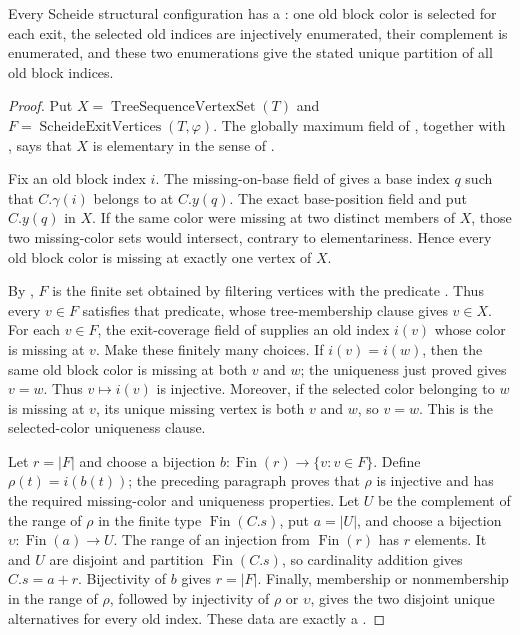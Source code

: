 \begin{helper}
Every Scheide structural configuration has a
: one old block color is selected
for each exit, the selected old indices are injectively enumerated, their
complement is enumerated, and these two enumerations give the stated
unique partition of all old block indices.
\end{helper}
\begin{proof}
Put $X=\operatorname{TreeSequenceVertexSet}(T)$ and
$F=\operatorname{ScheideExitVertices}(T,\varphi)$.  The globally maximum
field of , together with
, says that $X$ is elementary in the
sense of .

Fix an old block index $i$.  The missing-on-base field of
 gives a base index $q$ such that
$C.\gamma(i)$ belongs to
 at $C.y(q)$.  The exact base-position field and
 put $C.y(q)$ in $X$.  If the same color
were missing at two distinct members of $X$, those two missing-color sets
would intersect, contrary to elementariness.  Hence every old block color
is missing at exactly one vertex of $X$.

By , $F$ is the finite set obtained by filtering
vertices with the predicate .  Thus every $v\in F$
satisfies that predicate, whose tree-membership clause gives $v\in X$.  For
each $v\in F$, the exit-coverage field of
 supplies an old index $i(v)$
whose color is missing at $v$.  Make these finitely many choices.  If
$i(v)=i(w)$, then the same old block color is missing at both $v$ and $w$;
the uniqueness just proved gives $v=w$.  Thus $v\mapsto i(v)$ is
injective.  Moreover, if the selected color belonging to $w$ is missing
at $v$, its unique missing vertex is both $v$ and $w$, so $v=w$.  This is
the selected-color uniqueness clause.

Let $r=|F|$ and choose a bijection
$b:\operatorname{Fin}(r)\to\{v:v\in F\}$.  Define
$\rho(t)=i(b(t))$; the preceding paragraph proves that $\rho$ is injective
and has the required missing-color and uniqueness properties.  Let $U$ be
the complement of the range of $\rho$ in the finite type
$\operatorname{Fin}(C.s)$, put $a=|U|$, and choose a bijection
$\upsilon:\operatorname{Fin}(a)\to U$.  The range of an injection from
$\operatorname{Fin}(r)$ has $r$ elements.  It and $U$ are disjoint and
partition $\operatorname{Fin}(C.s)$, so cardinality addition gives
$C.s=a+r$.  Bijectivity of $b$ gives $r=|F|$.  Finally, membership or
nonmembership in the range of $\rho$, followed by injectivity of $\rho$
or $\upsilon$, gives the two disjoint unique alternatives for every old
index.  These data are exactly a
.
\end{proof}
